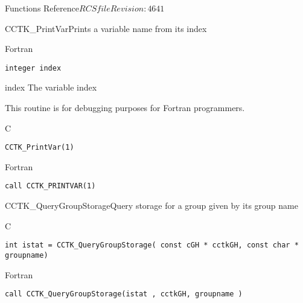 \begin{cactuspart}{ Functions Reference}{$RCSfile$}{$Revision: 4641 $}
\begin{FunctionDescription}{CCTK\_PrintVar}{Prints a variable name from its index}
\begin{SynopsisSection}
\begin{Synopsis}{Fortran}
\begin{verbatim}
integer index\end{verbatim}
\end{Synopsis}
\end{SynopsisSection}
\begin{ParameterSection}
\begin{Parameter}{index}
The variable index
\end{Parameter}
\end{ParameterSection}
\begin{Discussion}
This routine is for debugging purposes for Fortran programmers.
\end{Discussion}
\begin{ExampleSection}
\begin{Example}{C}
\begin{verbatim}
CCTK_PrintVar(1)
\end{verbatim}
\end{Example}
\begin{Example}{Fortran}
\begin{verbatim}
call CCTK_PRINTVAR(1)
\end{verbatim}
\end{Example}
\end{ExampleSection}
\end{FunctionDescription}







\begin{FunctionDescription}{CCTK\_QueryGroupStorage}{Query storage for a group given by its group name}
\label{CCTK-QueryGroupStorage}
\begin{SynopsisSection}
\begin{Synopsis}{C}
\begin{verbatim}int istat = CCTK_QueryGroupStorage( const cGH * cctkGH, const char * groupname)\end{verbatim}
\end{Synopsis}
\begin{Synopsis}{Fortran}
\begin{verbatim}call CCTK_QueryGroupStorage(istat , cctkGH, groupname )


\end{verbatim}
\end{Synopsis}
\end{SynopsisSection}
\end{FunctionDescription}
\end{cactuspart}
